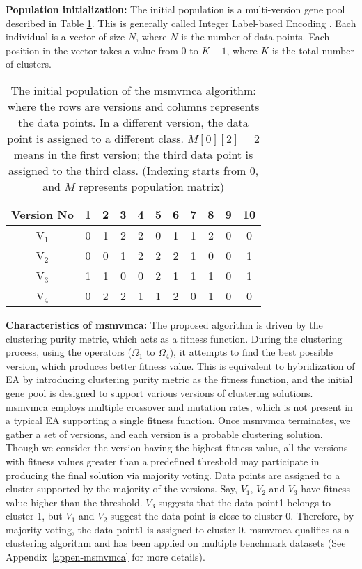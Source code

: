 \documentclass[fleqn,usenatbib]{mnras}
\begin{document}
\noindent \textbf{Population initialization:}
The initial population is a multi-version gene pool described in Table \ref{table:initpopu}. This is generally called Integer Label-based Encoding \citep{Murthy}. Each individual is a vector of size $N$, where $N$ is the number of data points. Each position in the vector takes a value from 0 to $K-1$, where $K$ is the total number of clusters.

\begin{table}
\centering
\caption{The initial population of the \acrshort{msmvmca} algorithm: where the rows are versions and columns represents the data points. In a different version, the data point is assigned to a different class. $M[0][2]=2$ means in the first version; the third data point is assigned to the third class. (Indexing starts from $0$, and $M$ represents population matrix)}
\label{table:initpopu}
\begin{tabular}{|c| c| c| c| c| c| c| c| c| c| c|} 
\hline %
Version No&1& 2 & 3&4&5& 6 & 7&8&9&10\\ 
\hline
V$_1$ & 0 & 1 & 2 & 2& 0& 1 &  1&2 &0 & 0\\ 
V$_2$ & 0 & 0 &1&2&2&2&1&0&0&1\\
V$_3$ & 1 &  1& 0& 0& 2&  1& 1& 1 &0 & 1\\
V$_4$ &0 &2 & 2 & 1& 1&2 &0 & 1 &0 &0\\
\hline
\end{tabular}
\end{table}

\noindent \textbf{Characteristics of \acrshort{msmvmca}:}\label{MSMVMCA}
The proposed algorithm is driven by the clustering purity metric, which acts as a fitness function. During the clustering process, using the operators (\(\Omega_1\) to $\Omega_4$), it attempts to find the best possible version, which produces better fitness value. This is equivalent to hybridization of EA by introducing clustering purity metric as the fitness function, and the initial gene pool is designed to support various versions of clustering solutions. \acrshort{msmvmca} employs multiple crossover and mutation rates, which is not present in a typical EA supporting a single fitness function.  
Once \acrshort{msmvmca} terminates,  we gather a set of versions, and each version is a probable clustering solution. Though we consider the version having the highest fitness value, all the versions with fitness values greater than a predefined threshold may participate in producing the final solution via majority voting. Data points are assigned to a cluster supported by the majority of the versions. Say, $V_1$, $V_2$ and $V_3$ have fitness value higher than the threshold. $V_3$ suggests that the data point1 belongs to cluster 1, but $V_1$ and $V_2$ suggest the data point is close to cluster 0. Therefore, by majority voting, the data point1 is assigned to cluster 0. \acrshort{msmvmca} qualifies as a clustering algorithm and has been applied on multiple benchmark datasets (See Appendix~\ref{appen-msmvmca} for more details).
\end{document}
